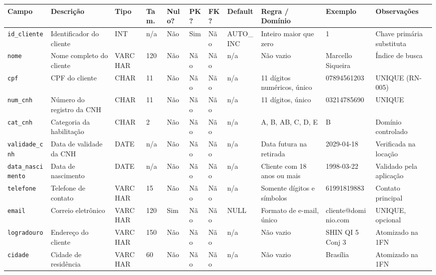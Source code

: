 \begin{table}[!t]
\begin{tabular}{|L{2.15cm}|L{2.7cm}|L{1.15cm}|C{0.62cm}|C{0.62cm}|C{0.5cm}|C{0.5cm}|L{1.45cm}|L{2.6cm}|L{2.0cm}|L{1.85cm}|}
\hline
\textbf{Campo} & \textbf{Descri\c{c}\~ao} & \textbf{Tipo} & \textbf{Tam.} & \textbf{Nulo?} & \textbf{PK?} & \textbf{FK?} & \textbf{Default} & \textbf{Regra / Dom\'inio} & \textbf{Exemplo} & \textbf{Observa\c{c}\~oes} \\
\hline
\texttt{id\_\allowbreak{}cliente} & Identificador do cliente & INT & n/a & N\~ao & Sim & N\~ao & AUTO\_\allowbreak{}INC & Inteiro maior que zero & 1 & Chave prim\'aria substituta \\
\hline
\texttt{nome} & Nome completo do cliente & VARCHAR & 120 & N\~ao & N\~ao & N\~ao & n/a & N\~ao vazio & Marcello Siqueira & \'Indice de busca \\
\hline
\texttt{cpf} & CPF do cliente & CHAR & 11 & N\~ao & N\~ao & N\~ao & n/a & 11 d\'igitos num\'ericos, \'unico & 07894561203 & UNIQUE (RN-005) \\
\hline
\texttt{num\_\allowbreak{}cnh} & N\'umero do registro da CNH & CHAR & 11 & N\~ao & N\~ao & N\~ao & n/a & 11 d\'igitos, \'unico & 03214785690 & UNIQUE \\
\hline
\texttt{cat\_\allowbreak{}cnh} & Categoria da habilita\c{c}\~ao & CHAR & 2 & N\~ao & N\~ao & N\~ao & n/a & A, B, AB, C, D, E & B & Dom\'inio controlado \\
\hline
\texttt{validade\_\allowbreak{}cnh} & Data de validade da CNH & DATE & n/a & N\~ao & N\~ao & N\~ao & n/a & Data futura na retirada & 2029-04-18 & Verificada na loca\c{c}\~ao \\
\hline
\texttt{data\_\allowbreak{}nascimento} & Data de nascimento & DATE & n/a & N\~ao & N\~ao & N\~ao & n/a & Cliente com 18 anos ou mais & 1998-03-22 & Validado pela aplica\c{c}\~ao \\
\hline
\texttt{telefone} & Telefone de contato & VARCHAR & 15 & N\~ao & N\~ao & N\~ao & n/a & Somente d\'igitos e s\'imbolos & 61991819883 & Contato principal \\
\hline
\texttt{email} & Correio eletr\^onico & VARCHAR & 120 & Sim & N\~ao & N\~ao & NULL & Formato de e-mail, \'unico & cliente@\allowbreak{}dominio.com & UNIQUE, opcional \\
\hline
\texttt{logradouro} & Endere\c{c}o do cliente & VARCHAR & 150 & N\~ao & N\~ao & N\~ao & n/a & N\~ao vazio & SHIN QI 5 Conj 3 & Atomizado na 1FN \\
\hline
\texttt{cidade} & Cidade de resid\^encia & VARCHAR & 60 & N\~ao & N\~ao & N\~ao & n/a & N\~ao vazio & Bras\'ilia & Atomizado na 1FN \\

\end{tabular}
\end{table}

